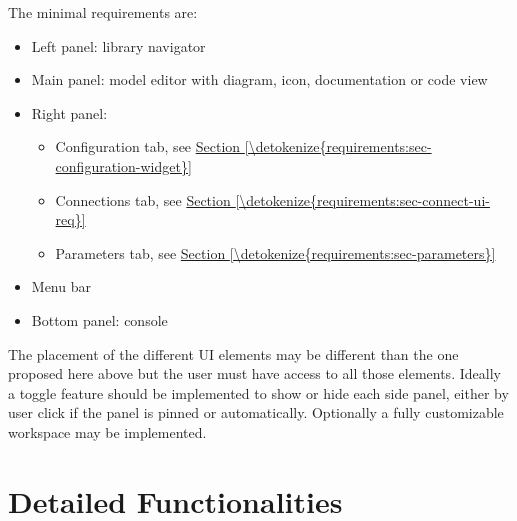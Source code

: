\documentclass[letterpaper,10pt, openany,english]{sphinxmanual}
\begin{document}
The minimal requirements are:
\begin{itemize}
\item {} 
Left panel: library navigator

\item {} 
Main panel: model editor with diagram, icon, documentation or code view

\item {} 
Right panel:
\begin{itemize}
\item {} 
Configuration tab, see \hyperref[\detokenize{requirements:sec-configuration-widget}]{Section \ref{\detokenize{requirements:sec-configuration-widget}}}

\item {} 
Connections tab, see \hyperref[\detokenize{requirements:sec-connect-ui-req}]{Section \ref{\detokenize{requirements:sec-connect-ui-req}}}

\item {} 
Parameters tab, see \hyperref[\detokenize{requirements:sec-parameters}]{Section \ref{\detokenize{requirements:sec-parameters}}}

\end{itemize}

\item {} 
Menu bar

\item {} 
Bottom panel: console

\end{itemize}

The placement of the different UI elements may be different than the one proposed here above but the user must have access to all those elements.
Ideally a toggle feature should be implemented to show or hide each side panel, either by user click if the panel is pinned or automatically.
Optionally a fully customizable workspace may be implemented.


\section{Detailed Functionalities}
\label{\detokenize{requirements:detailed-functionalities}}\label{\detokenize{requirements:sec-functionalities}}
\end{document}
